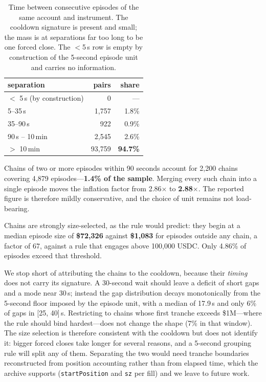 \documentclass[11pt,a4paper]{article}
\begin{document}
\begin{table}[htbp]
\centering
\caption{Time between consecutive episodes of the same account and instrument. The cooldown
signature is present and small; the mass is at separations far too long to be one forced close.
The $<$5\,s row is empty by construction of the 5-second episode unit and carries no
information.}
\label{tab:cooldown}
\begin{tabular}{lrr}
\toprule
separation & pairs & share \\
\midrule
$<$ 5\,s (by construction) & 0 & --- \\
5--35\,s & 1{,}757 & 1.8\% \\
35--90\,s & 922 & 0.9\% \\
90\,s -- 10\,min & 2{,}545 & 2.6\% \\
$>$ 10\,min & 93{,}759 & \textbf{94.7\%} \\
\bottomrule
\end{tabular}
\end{table}

Chains of two or more episodes within 90 seconds account for 2{,}200 chains covering 4{,}879
episodes---\textbf{1.4\% of the sample}. Merging every such chain into a single episode moves the
inflation factor from 2.86$\times$ to \textbf{2.88$\times$}. The reported figure is therefore
mildly conservative, and the choice of unit remains not load-bearing.

Chains are strongly size-selected, as the rule would predict: they begin at a median episode
size of \textbf{\$72{,}326} against \textbf{\$1{,}083} for episodes outside any chain, a
factor of 67, against a rule that engages above 100{,}000 USDC. Only 4.86\% of episodes exceed
that threshold.

We stop short of attributing the chains to the cooldown, because their \emph{timing} does not
carry its signature. A 30-second wait should leave a deficit of short gaps and a mode near 30\,s;
instead the gap distribution decays monotonically from the 5-second floor imposed by the episode
unit, with a median of 17.9\,s and only 6\% of gaps in [25, 40]\,s. Restricting to chains whose
first tranche exceeds \$1M---where the rule should bind hardest---does not change the shape
(7\% in that window). The size selection is therefore consistent with the cooldown but does not
identify it: bigger forced closes take longer for several reasons, and a 5-second grouping rule
will split any of them. Separating the two would need tranche boundaries reconstructed from
position accounting rather than from elapsed time, which the archive supports
(\texttt{startPosition} and \texttt{sz} per fill) and we leave to future work.
\end{document}
